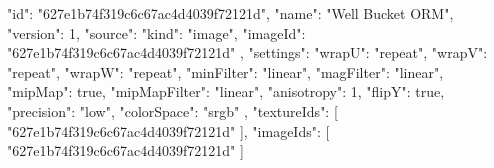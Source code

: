 {
  "id": "627e1b74f319c6c67ac4d4039f72121d",
  "name": "Well Bucket ORM",
  "version": 1,
  "source": {
    "kind": "image",
    "imageId": "627e1b74f319c6c67ac4d4039f72121d"
  },
  "settings": {
    "wrapU": "repeat",
    "wrapV": "repeat",
    "wrapW": "repeat",
    "minFilter": "linear",
    "magFilter": "linear",
    "mipMap": true,
    "mipMapFilter": "linear",
    "anisotropy": 1,
    "flipY": true,
    "precision": "low",
    "colorSpace": "srgb"
  },
  "textureIds": [
    "627e1b74f319c6c67ac4d4039f72121d"
  ],
  "imageIds": [
    "627e1b74f319c6c67ac4d4039f72121d"
  ]
}
